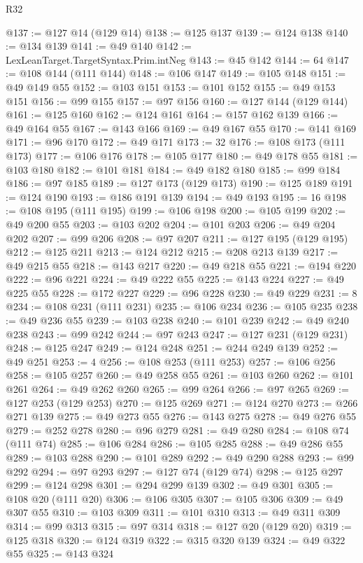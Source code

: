 \begin{lexlean}{R32}
\begin{coremodule}
@137 := @127 @14 (@129 @14)
@138 := @125 @137
@139 := @124 @138
@140 := @134 @139
@141 := @49 @140
@142 := LexLeanTarget.TargetSyntax.Prim.intNeg
@143 := @45 @142
@144 := 64
@147 := @108 @144 (@111 @144)
@148 := @106 @147
@149 := @105 @148
@151 := @49 @149 @55
@152 := @103 @151
@153 := @101 @152
@155 := @49 @153 @151
@156 := @99 @155
@157 := @97 @156
@160 := @127 @144 (@129 @144)
@161 := @125 @160
@162 := @124 @161
@164 := @157 @162 @139
@166 := @49 @164 @55
@167 := @143 @166
@169 := @49 @167 @55
@170 := @141 @169
@171 := @96 @170
@172 := @49 @171
@173 := 32
@176 := @108 @173 (@111 @173)
@177 := @106 @176
@178 := @105 @177
@180 := @49 @178 @55
@181 := @103 @180
@182 := @101 @181
@184 := @49 @182 @180
@185 := @99 @184
@186 := @97 @185
@189 := @127 @173 (@129 @173)
@190 := @125 @189
@191 := @124 @190
@193 := @186 @191 @139
@194 := @49 @193
@195 := 16
@198 := @108 @195 (@111 @195)
@199 := @106 @198
@200 := @105 @199
@202 := @49 @200 @55
@203 := @103 @202
@204 := @101 @203
@206 := @49 @204 @202
@207 := @99 @206
@208 := @97 @207
@211 := @127 @195 (@129 @195)
@212 := @125 @211
@213 := @124 @212
@215 := @208 @213 @139
@217 := @49 @215 @55
@218 := @143 @217
@220 := @49 @218 @55
@221 := @194 @220
@222 := @96 @221
@224 := @49 @222 @55
@225 := @143 @224
@227 := @49 @225 @55
@228 := @172 @227
@229 := @96 @228
@230 := @49 @229
@231 := 8
@234 := @108 @231 (@111 @231)
@235 := @106 @234
@236 := @105 @235
@238 := @49 @236 @55
@239 := @103 @238
@240 := @101 @239
@242 := @49 @240 @238
@243 := @99 @242
@244 := @97 @243
@247 := @127 @231 (@129 @231)
@248 := @125 @247
@249 := @124 @248
@251 := @244 @249 @139
@252 := @49 @251
@253 := 4
@256 := @108 @253 (@111 @253)
@257 := @106 @256
@258 := @105 @257
@260 := @49 @258 @55
@261 := @103 @260
@262 := @101 @261
@264 := @49 @262 @260
@265 := @99 @264
@266 := @97 @265
@269 := @127 @253 (@129 @253)
@270 := @125 @269
@271 := @124 @270
@273 := @266 @271 @139
@275 := @49 @273 @55
@276 := @143 @275
@278 := @49 @276 @55
@279 := @252 @278
@280 := @96 @279
@281 := @49 @280
@284 := @108 @74 (@111 @74)
@285 := @106 @284
@286 := @105 @285
@288 := @49 @286 @55
@289 := @103 @288
@290 := @101 @289
@292 := @49 @290 @288
@293 := @99 @292
@294 := @97 @293
@297 := @127 @74 (@129 @74)
@298 := @125 @297
@299 := @124 @298
@301 := @294 @299 @139
@302 := @49 @301
@305 := @108 @20 (@111 @20)
@306 := @106 @305
@307 := @105 @306
@309 := @49 @307 @55
@310 := @103 @309
@311 := @101 @310
@313 := @49 @311 @309
@314 := @99 @313
@315 := @97 @314
@318 := @127 @20 (@129 @20)
@319 := @125 @318
@320 := @124 @319
@322 := @315 @320 @139
@324 := @49 @322 @55
@325 := @143 @324

\end{coremodule}
\end{lexlean}
